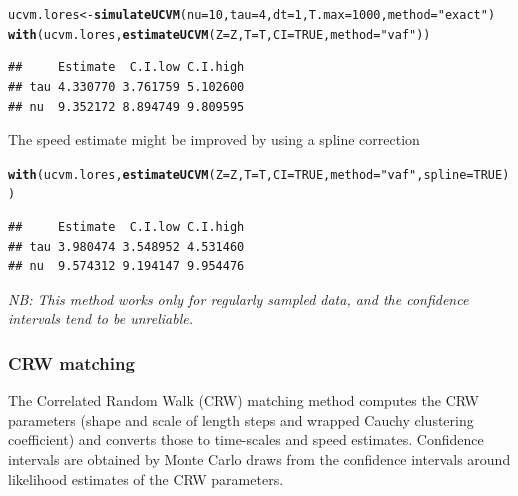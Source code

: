 \documentclass[10pt]{article}\usepackage[]{graphicx}\usepackage[]{color}
\makeatletter
\newcommand{\hlnum}[1]{\textcolor[rgb]{0.686,0.059,0.569}{#1}}%
\newcommand{\hlstr}[1]{\textcolor[rgb]{0.192,0.494,0.8}{#1}}%
\newcommand{\hlstd}[1]{\textcolor[rgb]{0.345,0.345,0.345}{#1}}%
\newcommand{\hlkwb}[1]{\textcolor[rgb]{0.69,0.353,0.396}{#1}}%
\newcommand{\hlkwc}[1]{\textcolor[rgb]{0.333,0.667,0.333}{#1}}%
\newcommand{\hlkwd}[1]{\textcolor[rgb]{0.737,0.353,0.396}{\textbf{#1}}}%
\newenvironment{kframe}{%
 \def\at@end@of@kframe{}%
 \ifinner\ifhmode%
  \def\at@end@of@kframe{\end{minipage}}%
  \begin{minipage}{\columnwidth}%
 \fi\fi%
 \def\FrameCommand##1{\hskip\@totalleftmargin \hskip-\fboxsep
 \colorbox{shadecolor}{##1}\hskip-\fboxsep
     \hskip-\linewidth \hskip-\@totalleftmargin \hskip\columnwidth}%
 \MakeFramed {\advance\hsize-\width
   \@totalleftmargin\z@ \linewidth\hsize
   \@setminipage}}%
 {\par\unskip\endMakeFramed%
 \at@end@of@kframe}
\newenvironment{knitrout}{}{} %
\makeatother
\begin{document}
\begin{knitrout}
\color{fgcolor}\begin{kframe}
\begin{alltt}
\hlstd{ucvm.lores} \hlkwb{<-} \hlkwd{simulateUCVM}\hlstd{(}\hlkwc{nu}\hlstd{=}\hlnum{10}\hlstd{,} \hlkwc{tau} \hlstd{=} \hlnum{4}\hlstd{,} \hlkwc{dt} \hlstd{=} \hlnum{1}\hlstd{,} \hlkwc{T.max} \hlstd{=} \hlnum{1000}\hlstd{,} \hlkwc{method} \hlstd{=} \hlstr{"exact"}\hlstd{)}
\hlkwd{with}\hlstd{(ucvm.lores,} \hlkwd{estimateUCVM}\hlstd{(}\hlkwc{Z} \hlstd{= Z,} \hlkwc{T} \hlstd{= T,} \hlkwc{CI}\hlstd{=}\hlnum{TRUE}\hlstd{,} \hlkwc{method}\hlstd{=}\hlstr{"vaf"}\hlstd{))}
\end{alltt}
\begin{verbatim}
##     Estimate  C.I.low C.I.high
## tau 4.330770 3.761759 5.102600
## nu  9.352172 8.894749 9.809595
\end{verbatim}
\end{kframe}
\end{knitrout}
\noindent The speed estimate might be improved by using a spline correction
\begin{knitrout}
\color{fgcolor}\begin{kframe}
\begin{alltt}
\hlkwd{with}\hlstd{(ucvm.lores,} \hlkwd{estimateUCVM}\hlstd{(}\hlkwc{Z} \hlstd{= Z,} \hlkwc{T} \hlstd{= T,} \hlkwc{CI}\hlstd{=}\hlnum{TRUE}\hlstd{,} \hlkwc{method}\hlstd{=}\hlstr{"vaf"}\hlstd{,} \hlkwc{spline} \hlstd{=} \hlnum{TRUE}\hlstd{))}
\end{alltt}
\begin{verbatim}
##     Estimate  C.I.low C.I.high
## tau 3.980474 3.548952 4.531460
## nu  9.574312 9.194147 9.954476
\end{verbatim}
\end{kframe}
\end{knitrout}

\noindent \emph{NB: This method works only for regularly sampled data, and the confidence intervals tend to be unreliable.}

\subsubsection{CRW matching}

The Correlated Random Walk (CRW) matching method computes the CRW parameters (shape and scale of length steps and wrapped Cauchy clustering coefficient) and converts those to time-scales and speed estimates.  Confidence intervals are obtained by Monte Carlo draws from the confidence intervals around likelihood estimates of the CRW parameters.  
\end{document}
